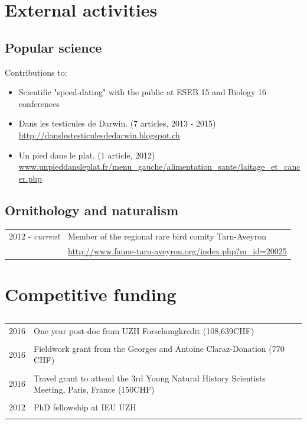 \documentclass[a4paper,10pt]{article} %
\begin{document}
\section*{External activities}

\subsection*{Popular science}

Contributions to:
\begin{itemize}
	\item Scientific "speed-dating" with the public at ESEB 15 and Biology 16 conferences
\item Dans les testicules de Darwin. (7 articles, 2013 - 2015) \\ \url{http://danslestesticulesdedarwin.blogspot.ch}
\item Un pied dans le plat. (1 article, 2012) \\ \url{www.unpieddansleplat.fr/menu_gauche/alimentation_sante/laitage_et_cancer.php}
\end{itemize}

\subsection*{Ornithology and naturalism}
\begin{tabular}{p{4cm}|p{11cm}}
\hfill \textsc{2012 -} \emph{current} & Member of the regional rare bird comity Tarn-Aveyron\\
															& \url{http://www.faune-tarn-aveyron.org/index.php?m_id=20025}\\
\end{tabular}

\section*{Competitive funding}
\subsection*{}
\begin{tabular}{p{4cm}|p{11cm}}
\hfill \textsc{2016} & One year post-doc from UZH Forschungkredit (108,639CHF)\\
\multicolumn{2}{c}{} \\
\hfill \textsc{2016} & Fieldwork grant from the Georges and Antoine Claraz-Donation ($770$CHF)\\
\multicolumn{2}{c}{} \\
\hfill \textsc{2016} & Travel grant to attend the 3rd Young Natural History Scientists Meeting, Paris, France ($150$CHF)\\
\multicolumn{2}{c}{} \\
\hfill \textsc{2012} & PhD fellowship at IEU UZH\\
\multicolumn{2}{c}{} \\
\end{tabular}
\end{document}
